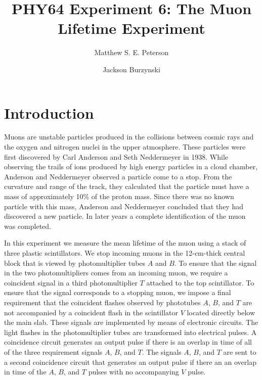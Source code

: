 \documentclass[aps, reprint,amsmath,amssymb]{revtex4-1} %
\begin{document}
\title{PHY64 Experiment 6: The Muon Lifetime Experiment}
\author{Matthew S. E. Peterson}
\author{Jackson Burzynski}
\maketitle

\section{Introduction}
Muons are unstable particles produced in the collisions between cosmic rays and the oxygen and nitrogen nuclei in the upper atmosphere. These particles were first discovered by Carl Anderson and Seth Neddermeyer in 1938. While observing the trails of ions produced by high energy particles in a cloud chamber, Anderson and Neddermeyer observed a particle come to a stop. From the curvature and range of the track, they calculated that the particle must have a mass of approximately 10\% of the proton mass. Since there was no known particle with this mass, Anderson and Neddermeyer concluded that they had discovered a new particle. In later years a complete identification of the muon was completed.

In this experiment we measure the mean lifetime of the muon using a stack of three plastic scintillators. We stop incoming muons in the 12-cm-thick central block that is viewed by photomultiplier tubes $A$ and $B$. To ensure that the signal in the two photomultipliers comes from an incoming muon, we require a coincident signal in a third photomultiplier $T$ attached to the top scintillator. To ensure that the signal corresponds to a stopping muon, we impose a final requirement that the coincident flashes observed by phototubes $A$, $B$, and $T$ are not accompanied by a coincident flash in the scintillator $V$ located directly below the main slab. These signals are implemented by means of electronic circuits. The light flashes in the photomultiplier tubes are transformed into electrical pulses. A coincidence circuit generates an output pulse if there is an overlap in time of all of the three requirement signals $A$, $B$, and $T$. The signals $A$, $B$, and $T$ are sent to a second coincidence circuit that generates an output pulse if there an an overlap in time of the $A$, $B$, and $T$ pulses with no accompanying $V$ pulse.
\end{document}

